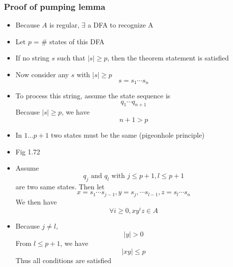 \begin{frame}[allowframebreaks] \frametitle{Proof of pumping lemma}
\begin{itemize}
\item Because $A$ is regular, $\exists$ a DFA
   to recognize A
 \item [] Let $p$ = \# states of this DFA
 \item If no string $s$ such that
   $|s| \geq p$, then the theorem statement is satisfied

\item Now consider any $s$ with $|s| \geq p$
  \begin{equation*}
    s = s_1 \cdots s_n
  \end{equation*}
\item To process this string, assume the
  state sequence is 
  \begin{equation*}
q_1 \cdots q_{n+1}
\end{equation*}
Because $|s|\geq p$, we have
\begin{equation*}
n+1 > p
\end{equation*}

\item In 
$1\ldots p+1$ two states must be the same (pigeonhole principle)

\item [] Fig 1.72


  \begin{center}
\end{center}

\item Assume 
  \begin{equation*}
q_j \text{ and } q_l \text{ with } j \leq p+1, l \leq p+1
\end{equation*}
are two same states. Then let
\begin{equation*}
x = s_1 \cdots s_{j-1},
y = s_j,  \cdots s_{l-1},
z = s_l \cdots s_n
\end{equation*}
We then have
\begin{equation*}
  \forall i \geq 0, xy^i z \in A
\end{equation*}
\item Because $j \neq l$, 
\begin{equation*}
|y| > 0
\end{equation*}
From $l \leq p+1$, we have
\begin{equation*}
|xy| \leq p
\end{equation*}
Thus all conditions are satisfied
\end{itemize}\end{frame} 




